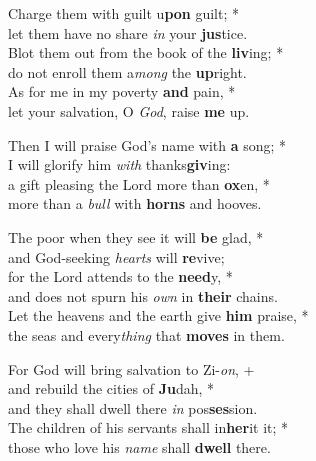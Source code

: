 Charge them with guilt u\textbf{pon} guilt; *\\
let them have no share \emph{in} your \textbf{jus}tice. \\
Blot them out from the book of the \textbf{liv}ing; *\\
do not enroll them a\emph{mong} the \textbf{up}right. \\
As for me in my poverty \textbf{and} pain, *\\
let your salvation, O \emph{God}, raise \textbf{me} up. 

Then I will praise God's name with \textbf{a} song; *\\
I will glorify him \emph{with} thanks\textbf{giv}ing: \\
a gift pleasing the Lord more than \textbf{ox}en, *\\
more than a \emph{bull} with \textbf{horns} and hooves. 

The poor when they see it will \textbf{be} glad, *\\
and God-seeking \emph{hearts} will \textbf{re}vive; \\
for the Lord attends to the \textbf{need}y, *\\
and does not spurn his \emph{own} in \textbf{their} chains. \\
Let the heavens and the earth give \textbf{him} praise, *\\
the seas and every\emph{thing} that \textbf{moves} in them. 

For God will bring salvation to Zi-\emph{on}, +\\ 
and rebuild the cities of \textbf{Ju}dah, *\\
and they shall dwell there \emph{in} pos\textbf{ses}sion. \\
The children of his servants shall in\textbf{her}it it; *\\
those who love his \emph{name} shall \textbf{dwell} there. 
